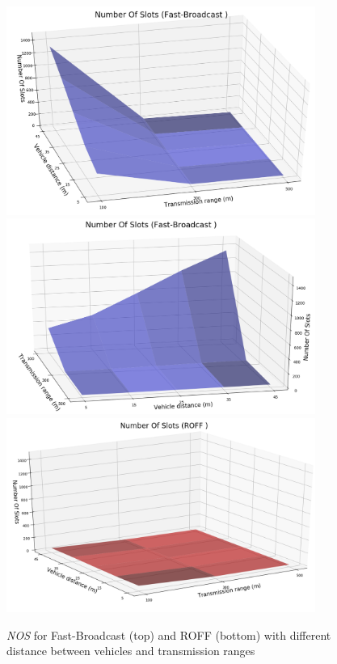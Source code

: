 		\begin{figure}[H]
			\centering
			\includegraphics[width=0.9\textwidth]{immagini/density/fb/nos-1}
			\includegraphics[width=0.9\textwidth]{immagini/density/fb/nos-2}
			\includegraphics[width=0.9\textwidth]{immagini/density/roff/nos}
			\caption{\textit{NOS} for Fast-Broadcast (top) and ROFF (bottom) with different distance between vehicles and transmission ranges}
			\label{fig:density-nos}
		\end{figure}
	
